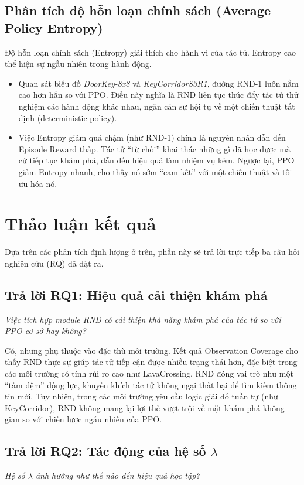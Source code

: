 \documentclass{uetgraduation}
\begin{document}
\subsection{Phân tích độ hỗn loạn chính sách (Average Policy Entropy)}

Độ hỗn loạn chính sách (Entropy) giải thích cho hành vi của tác tử. Entropy cao thể hiện sự ngẫu nhiên trong hành động.

\begin{itemize}
    \item Quan sát biểu đồ \textit{DoorKey-8x8} và \textit{KeyCorridorS3R1}, đường RND-1 luôn nằm cao hơn hẳn so với PPO. Điều này nghĩa là RND liên tục thúc đẩy tác tử thử nghiệm các hành động khác nhau, ngăn cản sự hội tụ về một chiến thuật tất định (deterministic policy).
    \item Việc Entropy giảm quá chậm (như RND-1) chính là nguyên nhân dẫn đến Episode Reward thấp. Tác tử ``từ chối'' khai thác những gì đã học được mà cứ tiếp tục khám phá, dẫn đến hiệu quả làm nhiệm vụ kém. Ngược lại, PPO giảm Entropy nhanh, cho thấy nó sớm ``cam kết'' với một chiến thuật và tối ưu hóa nó.
\end{itemize}

\section{Thảo luận kết quả}

Dựa trên các phân tích định lượng ở trên, phần này sẽ trả lời trực tiếp ba câu hỏi nghiên cứu (RQ) đã đặt ra.

\subsection{Trả lời RQ1: Hiệu quả cải thiện khám phá}
\textit{Việc tích hợp module RND có cải thiện khả năng khám phá của tác tử so với PPO cơ sở hay không?}

Có, nhưng phụ thuộc vào đặc thù môi trường. Kết quả Observation Coverage cho thấy RND thực sự giúp tác tử tiếp cận được nhiều trạng thái hơn, đặc biệt trong các môi trường có tính rủi ro cao như LavaCrossing. RND đóng vai trò như một ``tấm đệm'' động lực, khuyến khích tác tử không ngại thất bại để tìm kiếm thông tin mới. Tuy nhiên, trong các môi trường yêu cầu logic giải đố tuần tự (như KeyCorridor), RND không mang lại lợi thế vượt trội về mặt khám phá không gian so với chiến lược ngẫu nhiên của PPO.

\subsection{Trả lời RQ2: Tác động của hệ số $\lambda$}
\textit{Hệ số $\lambda$ ảnh hưởng như thế nào đến hiệu quả học tập?}
\end{document}
